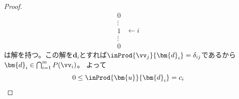 \begin{proof}
\[{\begin{array}{c}
                        0\\
                        \vdots\\
                        1\\
                        \vdots\\
                        0
                    \end{array}
                }
                \begin{array}{c}
                    \quad\\
                    \quad\\
                    \leftarrow i\\
                    \quad\\
                    \quad
                \end{array}
            \]
            は解を持つ。この解を$\bm{d}_i$とすれば$\inProd{\vv_j}{\bm{d}_i}=\delta_{ij}$であるから$\bm{d}_i\in\bigcap_{i=1}^{m}{P(\vv_i)}$。
            よって
            \[0\leq\inProd{\bm{u}}{\bm{d}_i} = c_i\]
        \end{proof}